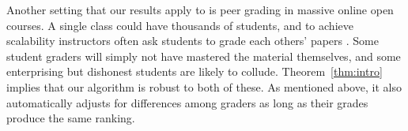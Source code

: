 Another setting that our results apply to is peer grading in massive online open courses. 
A single class could have thousands of students, 
and to achieve scalability instructors often ask students to grade each others' 
papers \citep{kulkarni2015peer,piech2013tuned}. 
Some student graders will simply not have mastered the material themselves, 
and some enterprising but dishonest students are likely to collude. Theorem~\ref{thm:intro} 
implies that our algorithm is robust to both of these. 
As mentioned above, it also automatically adjusts for differences among graders 
as long as their grades produce the same ranking.




